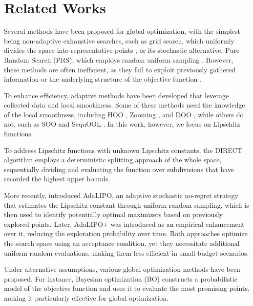 \section{Related Works}
\label{related}


Several methods have been proposed for global optimization, with the simplest being non-adaptive exhaustive searches, such as grid search, which uniformly divides the space into representative points \citep{zabinsky2013stochastic}, or its stochastic alternative, Pure Random Search (PRS), which employs random uniform sampling \citep{brooks1958discussion, zabinsky2013stochastic}. However, these methods are often inefficient, as they fail to exploit previously gathered information or the underlying structure of the objective function \citep{zabinsky2013stochastic}.

To enhance efficiency, adaptive methods have been developed that leverage collected data and local smoothness. Some of these methods need the knowledge of the local smoothness, including HOO \citep{bubeck2011x}, Zooming \citep{kleinberg2008multi}, and DOO \citep{munos2011optimistic}, while others do not, such as SOO \citep{munos2011optimistic, preux2014bandits, kawaguchi2016global} and SequOOL \citep{pmlr-v98-bartlett19a}. In this work, however, we focus on Lipschitz functions. 

To address Lipschitz functions with unknown Lipschitz constants, the DIRECT algorithm \citep{jones1993lipschitzian, jones2021direct} employs a deterministic splitting approach of the whole space, sequentially dividing and evaluating the function over subdivisions that have recorded the highest upper bounds. 

More recently, \cite{malherbe2017global} introduced AdaLIPO, an adaptive stochastic no-regret strategy that estimates the Lipschitz constant through uniform random sampling, which is then used to identify potentially optimal maximizers based on previously explored points. Later, AdaLIPO+ \citep{serre2024lipo+} was introduced as an empirical enhancement over it, reducing the exploration probability over time. Both approaches optimize the search space using an acceptance condition, yet they necessitate additional uniform random evaluations, making them less efficient in small-budget scenarios.

Under alternative assumptions, various global optimization methods have been proposed. For instance, Bayesian optimization (BO) \citep{fernando2014bayes, 7352306, frazier2018tutorial, balandat2020botorch} constructs a probabilistic model of the objective function and uses it to evaluate the most promising points, making it particularly effective for global optimization. 

